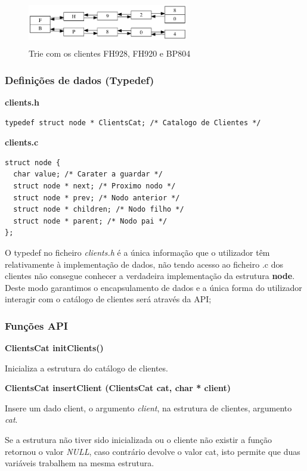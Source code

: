 \documentclass[10pt] {article}
\begin{document}
\begin{figure}[ht!]
\centering
\includegraphics[width=70mm, height=20mm]{trie.png}
\caption{Trie com os clientes FH928, FH920 e BP804}
\end{figure}

\subsubsection{Definições de dados (Typedef)}

\textbf{clients.h}
\begin{lstlisting}
typedef struct node * ClientsCat; /* Catalogo de Clientes */
\end{lstlisting}
\textbf{clients.c}
\begin{lstlisting}
struct node {
  char value; /* Carater a guardar */
  struct node * next; /* Proximo nodo */
  struct node * prev; /* Nodo anterior */
  struct node * children; /* Nodo filho */
  struct node * parent; /* Nodo pai */
};
\end{lstlisting}
\par {O typedef no ficheiro \emph{clients.h} é a única informação que o utilizador têm relativamente à implementação
de dados, não tendo  acesso ao ficheiro .c dos clientes não consegue conhecer a verdadeira implementação da
estrutura \textbf{node}. Deste modo garantimos o encapsulamento de dados e a única forma do utilizador interagir
com o catálogo de clientes será através da API;} \\

\subsubsection{Funções API}

\noindent\textbf{ClientsCat initClients()}
\par Inicializa a estrutura do catálogo de clientes.

\noindent\textbf{ClientsCat insertClient (ClientsCat cat, char * client)}
\par Insere um dado client, o argumento \emph{client}, na estrutura de clientes, argumento \emph{cat}.
\par Se a estrutura não tiver sido inicializada ou o cliente não existir a função retornou o valor \emph{NULL},
caso contrário devolve o valor cat, isto permite que duas variáveis trabalhem na mesma estrutura. \\
\end{document}
